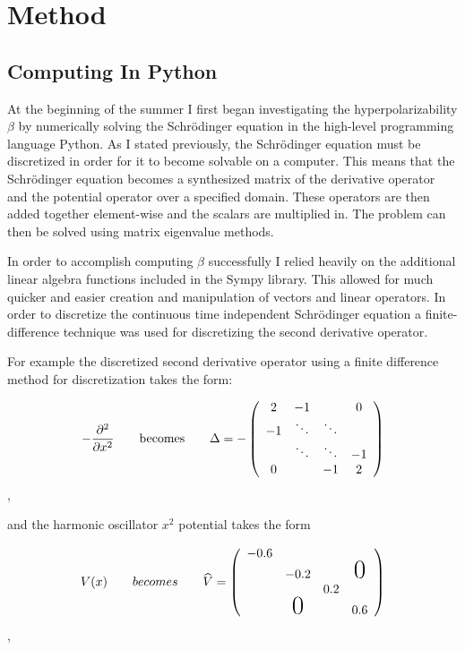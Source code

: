 \documentclass{report}
\theoremstyle{definition}
\begin{document}
\section*{Method}

\subsection*{Computing In Python}
At the beginning of the summer I first began investigating the hyperpolarizability $\beta$ by numerically solving the Schr\"odinger equation in the high-level programming language Python. As I stated previously, the Schr\"odinger equation must be discretized in order for it to become solvable on a computer. This means that the Schr\"odinger equation becomes a synthesized matrix of the derivative operator and the potential operator over a specified domain. These operators are then added together element-wise and the scalars are multiplied in. The problem can then be solved using matrix eigenvalue methods.

In order to accomplish computing $\beta$ successfully I relied heavily on the additional linear algebra functions included in the  Sympy library. This allowed for much quicker and easier creation and manipulation of vectors and linear operators. In order to discretize the continuous time independent Schr\"odinger equation a finite-difference technique was used for discretizing the second derivative operator.

For example the discretized second derivative operator using a finite difference method for discretization takes the form\cite{watkins2004fundamentals}: 

\[-\frac{\partial^2}{\partial x^2} \qquad \mbox{becomes} \qquad \Delta = - \left( \begin{array}{c c c c}
2 & -1 & & 0\\
-1 & \ddots & \ddots & \\
& \ddots & \ddots & -1 \\
0 & & -1 & 2 \end{array} \right) \],

\noindent and the harmonic oscillator $x^2$ potential takes the form 

\[
V(x) \qquad becomes \qquad  \widehat{ V}= \left( \begin{array}{cccc}
   -0.6\\
    & -0.2 &  & \text{\huge0} \\
    & & 0.2\\
    & \text{\huge0} & & 0.6\\
 \end{array} \right) 
\],
\end{document}
